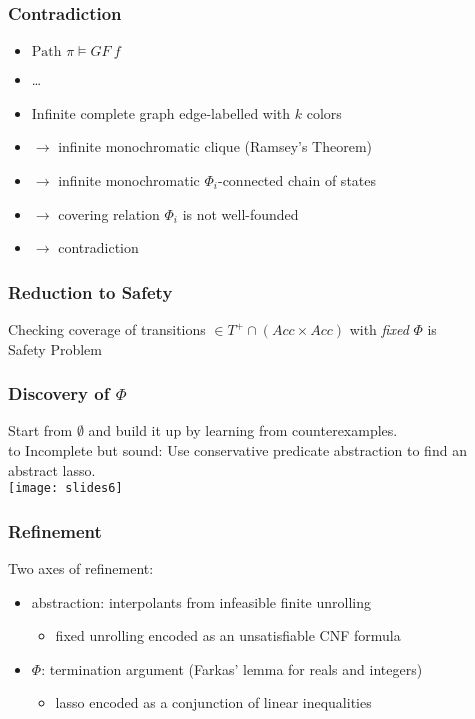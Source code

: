 \documentclass[d3s,tikz]{beamer}
\begin{document}
\begin{frame}
\frametitle{Contradiction}
\begin{itemize}
\itemsep=0.25cm
\item $\text{Path } \pi \models GF\ f$
\item \ldots
\item Infinite complete graph edge-labelled with $k$ colors
\itemsep=1cm
\item $\rightarrow$ infinite monochromatic clique (Ramsey's Theorem)
\itemsep=0.25cm
\item $\rightarrow$ infinite monochromatic $\Phi_i$-connected chain of states
\item $\rightarrow$ covering relation $\Phi_i$ is not well-founded
\item $\rightarrow$ contradiction
\end{itemize}
\end{frame}
\subtitleframe{}
\begin{frame}
\frametitle{Reduction to Safety}
Checking coverage of transitions $\in T^+ \cap (Acc \times Acc)$ with \emph{fixed} $\Phi$ is \\
\vskip1cm
\centering \Huge Safety Problem
\end{frame}
\begin{frame}
\frametitle{Discovery of $\Phi$}
Start from $\emptyset$ and build it up by learning from counterexamples. \\
\vskip0.5cm
\hbox to 
\vskip0.5cm
Incomplete but sound: Use conservative predicate abstraction to find an abstract lasso.\\
\vskip0.5cm
\centering\texttt{[image: slides6]}
\end{frame}
\begin{frame}
\frametitle{Refinement}
Two axes of refinement:
\begin{itemize}
\item abstraction: interpolants from infeasible finite unrolling
\begin{itemize}
\item fixed unrolling encoded as an unsatisfiable CNF formula
\end{itemize}
\item $\Phi$: termination argument (Farkas' lemma for reals and integers)
\begin{itemize}
\item lasso encoded as a conjunction of linear inequalities
\end{itemize}
\end{itemize}
\end{frame}
\end{document}

